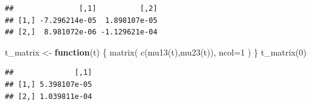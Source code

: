 \documentclass[a4paper,12pt,openany]{book}
\newenvironment{Shaded}{\begin{snugshade}}{\end{snugshade}}
\newcommand{\AttributeTok}[1]{\textcolor[rgb]{0.77,0.63,0.00}{#1}}
\newcommand{\ControlFlowTok}[1]{\textcolor[rgb]{0.13,0.29,0.53}{\textbf{#1}}}
\newcommand{\DecValTok}[1]{\textcolor[rgb]{0.00,0.00,0.81}{#1}}
\newcommand{\FunctionTok}[1]{\textcolor[rgb]{0.00,0.00,0.00}{#1}}
\newcommand{\NormalTok}[1]{#1}
\newcommand{\OtherTok}[1]{\textcolor[rgb]{0.56,0.35,0.01}{#1}}
\begin{document}
\begin{verbatim}
##               [,1]          [,2]
## [1,] -7.296214e-05  1.898107e-05
## [2,]  8.981072e-06 -1.129621e-04
\end{verbatim}

\begin{Shaded}
\begin{Highlighting}[]
\NormalTok{t\_matrix }\OtherTok{\textless{}{-}} \ControlFlowTok{function}\NormalTok{(t) \{}
  \FunctionTok{matrix}\NormalTok{(}
    \FunctionTok{c}\NormalTok{(}\FunctionTok{mu13}\NormalTok{(t),}\FunctionTok{mu23}\NormalTok{(t)),}
    \AttributeTok{ncol=}\DecValTok{1}
\NormalTok{  )}
\NormalTok{\}}
\FunctionTok{t\_matrix}\NormalTok{(}\DecValTok{0}\NormalTok{)}
\end{Highlighting}
\end{Shaded}

\begin{verbatim}
##              [,1]
## [1,] 5.398107e-05
## [2,] 1.039811e-04
\end{verbatim}
\end{document}
